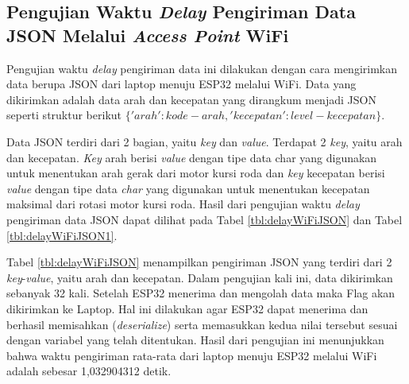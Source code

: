 \newpage

\subsection{Pengujian Waktu \emph{Delay} Pengiriman Data JSON Melalui \emph{Access Point} WiFi}
\label{sec:delayWiFiJSON}

Pengujian waktu \emph{delay} pengiriman data ini dilakukan dengan cara mengirimkan data berupa JSON dari laptop menuju ESP32 melalui WiFi. Data yang dikirimkan adalah data arah dan kecepatan yang dirangkum menjadi JSON seperti struktur berikut \(\{'arah': kode-arah, 'kecepatan': level-kecepatan\}\). 

Data JSON terdiri dari 2 bagian, yaitu \emph{key} dan \emph{value}. Terdapat 2 \emph{key}, yaitu arah dan kecepatan. \emph{Key} arah berisi \emph{value} dengan tipe data char yang digunakan untuk menentukan arah gerak dari motor kursi roda dan \emph{key} kecepatan berisi \emph{value} dengan tipe data \emph{char} yang digunakan untuk menentukan kecepatan maksimal dari rotasi motor kursi roda. Hasil dari pengujian waktu \emph{delay} pengiriman data JSON dapat dilihat pada Tabel \ref{tbl:delayWiFiJSON} dan Tabel \ref{tbl:delayWiFiJSON1}.

Tabel \ref{tbl:delayWiFiJSON} menampilkan pengiriman JSON yang terdiri dari 2 \emph{key}-\emph{value}, yaitu arah dan kecepatan. Dalam pengujian kali ini, data dikirimkan sebanyak 32 kali. Setelah ESP32 menerima dan mengolah data maka Flag akan dikirimkan ke Laptop. Hal ini dilakukan agar ESP32 dapat menerima dan berhasil memisahkan (\emph{deserialize}) serta memasukkan kedua nilai tersebut sesuai dengan variabel yang telah ditentukan. Hasil dari pengujian ini menunjukkan bahwa waktu pengiriman rata-rata dari laptop menuju ESP32 melalui WiFi adalah sebesar 1,032904312 detik.

